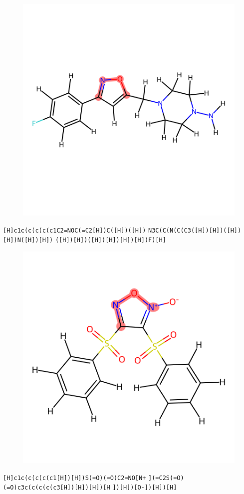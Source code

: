 \documentclass{article}
\begin{document}
\begin{figure}[ht]
\centering
    \includegraphics{mol252.png}
\end{figure}
\verb|[H]c1c(c(c(c(c1C2=NOC(=C2[H])C([H])([H])| \verb|N3C(C(N(C(C3([H])[H])([H])[H])N([H])[H])| \verb|([H])[H])([H])[H])[H])[H])F)[H]|

\begin{figure}[ht]
\centering
    \includegraphics{mol253.png}
\end{figure}
\verb|[H]c1c(c(c(c(c1[H])[H])S(=O)(=O)C2=NO[N+| \verb|](=C2S(=O)(=O)c3c(c(c(c(c3[H])[H])[H])[H| \verb|])[H])[O-])[H])[H]|
\end{document}
